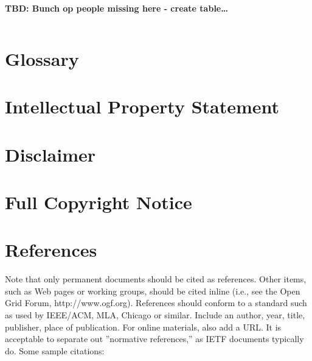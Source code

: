 \documentclass[10pt,a4paper]{article}
\begin{document}
\textbf{TBD: Bunch op people missing here - create table\ldots}

\begin{verbatim}

\end{verbatim}

\section{Glossary}


\section{Intellectual Property Statement}


\section{Disclaimer}


\section{Full Copyright Notice}


\section{References}

Note that only permanent documents should be cited as references. Other items, such as Web pages or working groups, should be cited inline (i.e., see the Open Grid Forum, http://www.ogf.org). References should conform to a standard such as used by IEEE/ACM, MLA, Chicago or similar. Include an author, year, title, publisher, place of publication. For online materials, also add a URL. It is acceptable to separate out ''normative references,'' as IETF documents typically do. Some sample citations: 
\end{document}
